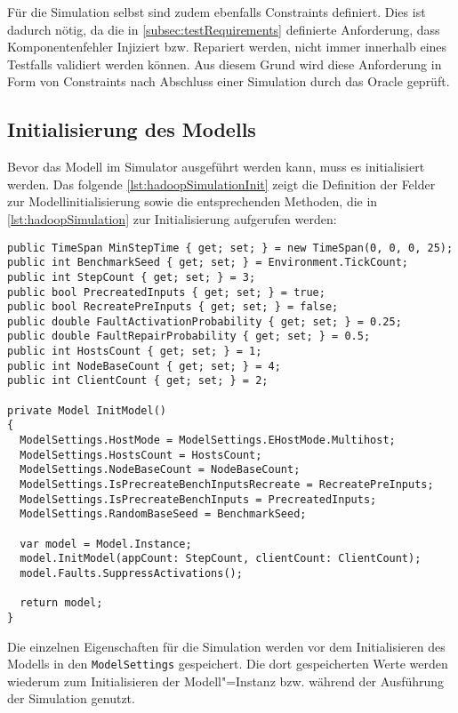 Für die Simulation selbst sind zudem ebenfalls Constraints definiert.
Dies ist dadurch nötig, da die in \cref{subsec:testRequirements} definierte Anforderung, dass Komponentenfehler Injiziert bzw. Repariert werden, nicht immer innerhalb eines Testfalls validiert werden können.
Aus diesem Grund wird diese Anforderung in Form von Constraints nach Abschluss einer Simulation durch das Oracle geprüft.

\subsection{Initialisierung des Modells}
\label{subsec:simulationModelInit}

Bevor das Modell im Simulator ausgeführt werden kann, muss es initialisiert werden.
Das folgende \cref{lst:hadoopSimulationInit} zeigt die Definition der Felder zur Modellinitialisierung sowie die entsprechenden Methoden, die in \cref{lst:hadoopSimulation} zur Initialisierung aufgerufen werden:

\begin{lstlisting}[label=lst:hadoopSimulationInit,style=cs,
caption={Initialisierung des Modells für die Simulation}]
public TimeSpan MinStepTime { get; set; } = new TimeSpan(0, 0, 0, 25);
public int BenchmarkSeed { get; set; } = Environment.TickCount;
public int StepCount { get; set; } = 3;
public bool PrecreatedInputs { get; set; } = true;
public bool RecreatePreInputs { get; set; } = false;
public double FaultActivationProbability { get; set; } = 0.25;
public double FaultRepairProbability { get; set; } = 0.5;
public int HostsCount { get; set; } = 1;
public int NodeBaseCount { get; set; } = 4;
public int ClientCount { get; set; } = 2;

private Model InitModel()
{
  ModelSettings.HostMode = ModelSettings.EHostMode.Multihost;
  ModelSettings.HostsCount = HostsCount;
  ModelSettings.NodeBaseCount = NodeBaseCount;
  ModelSettings.IsPrecreateBenchInputsRecreate = RecreatePreInputs;
  ModelSettings.IsPrecreateBenchInputs = PrecreatedInputs;
  ModelSettings.RandomBaseSeed = BenchmarkSeed;
  
  var model = Model.Instance;
  model.InitModel(appCount: StepCount, clientCount: ClientCount);
  model.Faults.SuppressActivations();
  
  return model;
}
\end{lstlisting}

Die einzelnen Eigenschaften für die Simulation werden vor dem Initialisieren des Modells in den \texttt{ModelSettings} gespeichert.
Die dort gespeicherten Werte werden wiederum zum Initialisieren der Modell"=Instanz bzw. während der Ausführung der Simulation genutzt.

